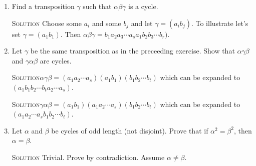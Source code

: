 \documentclass[twoside]{amsart}
\newcommand{\solution}{\textsc{Solution}\xspace}
\begin{document}
\begin{enumerate}[A.]
\begin{enumerate}[1]
      \item Find a transposition $\gamma$ such that $\alpha \beta \gamma$ is
      a cycle.

      \noindent \solution Choose some $a_i$ and some $b_j$ and let
      $\gamma = (a_ib_j)$. To illustrate let's set $\gamma = (a_1b_1)$.
      Then $\alpha \beta \gamma = b_1 a_2 a_3 \cdots a_s a_1 b_2 b_3
      \cdots b_r)$.

      \item Let $\gamma$ be the same transposition as in the preceeding 
      exercise. Show that $\alpha \gamma \beta$ and $\gamma \alpha \beta$
      are cycles.

      \noindent \solution $\alpha \gamma \beta =
      (a_1 a_2 \cdots a_s)(a_1b_1)(b_1 b_2 \cdots b_t)$ which can be
      expanded to $(a_1 b_1 b_2 \cdots b_t a_2 \cdots a_s)$.

      \noindent \solution $\gamma \alpha \beta = (a_1b_1)(a_1 a_2 \cdots a_s)
      (b_1 b_2 \cdots b_t)$ which can be expanded to 
      $(a_1 a_2 \cdots a_s b_1 b_2 \cdots b_t)$.

      \item Let $\alpha$ and $\beta$ be cycles of odd length (not disjoint).
      Prove that if $\alpha^2 = \beta^2$, then $\alpha = \beta$.

      \noindent \solution Trivial. Prove by contradiction. Assume 
      $\alpha \ne \beta$.

   \end{enumerate}
   
 
\end{enumerate}
\end{document}
